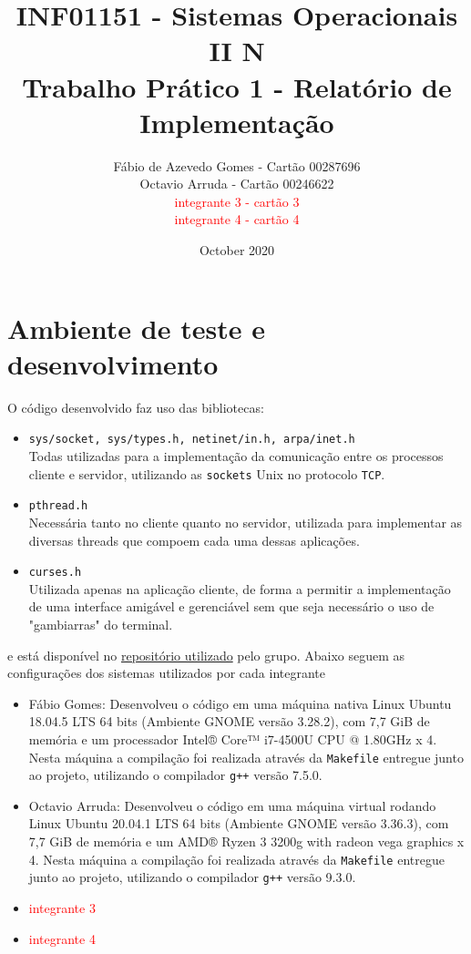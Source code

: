 \documentclass{article}
\title{INF01151 - Sistemas Operacionais II N \\ Trabalho Prático 1 - Relatório de Implementação  }
\author{Fábio de Azevedo Gomes - Cartão 00287696 \\ Octavio Arruda - Cartão 00246622 \\ \textcolor{red}{integrante 3 - cartão 3} \\ \textcolor{red}{integrante 4 - cartão 4}}
\date{October 2020}
\begin{document}
\maketitle

\section{Ambiente de teste e desenvolvimento}
O código desenvolvido faz uso das bibliotecas:
\begin{itemize}
    \item \texttt{sys/socket, sys/types.h, netinet/in.h, arpa/inet.h}
    \\ Todas utilizadas para a implementação da comunicação entre os processos cliente e servidor, utilizando as \texttt{sockets} Unix no protocolo \texttt{TCP}.
    \item \texttt{pthread.h}
    \\ Necessária tanto no cliente quanto no servidor, utilizada para implementar as diversas threads que compoem cada uma dessas aplicações.
    \item \texttt{curses.h}
    \\ Utilizada apenas na aplicação cliente, de forma a permitir a implementação de uma interface amigável e gerenciável sem que seja necessário o uso de "gambiarras" do terminal.
\end{itemize}
e está disponível no  \href{http://github.com/FabioAzevedoGomes/SisOp2}{repositório utilizado} pelo grupo. Abaixo seguem as configurações dos sistemas utilizados por cada integrante
\begin{itemize}
\item Fábio Gomes: Desenvolveu o código em uma máquina nativa Linux Ubuntu 18.04.5 LTS 64 bits (Ambiente GNOME versão 3.28.2), com 7,7 GiB de memória e um processador Intel® Core™ i7-4500U CPU @ 1.80GHz x 4. Nesta máquina a compilação foi realizada através da \texttt{Makefile} entregue junto ao projeto, utilizando o compilador \texttt{g++} versão 7.5.0. 
\item Octavio Arruda: Desenvolveu o código em uma máquina virtual rodando Linux Ubuntu 20.04.1 LTS 64 bits (Ambiente GNOME versão 3.36.3), com 7,7 GiB de memória e um AMD® Ryzen 3 3200g with radeon vega graphics x 4. Nesta máquina a compilação foi realizada através da \texttt{Makefile} entregue junto ao projeto, utilizando o compilador \texttt{g++} versão 9.3.0. 
\item \textcolor{red}{integrante 3} %
\item \textcolor{red}{integrante 4} %
\end{itemize}
\end{document}
